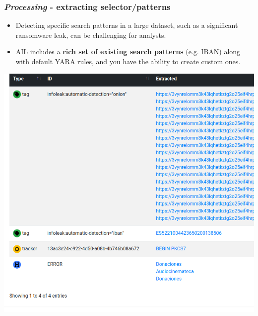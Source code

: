 \documentclass{beamer}
\begin{document}
\begin{frame}
   \frametitle{{\it Processing} - extracting selector/patterns}
	\begin{itemize}
		\item Detecting specific search patterns in a large dataset, such as a significant ransomware leak, can be challenging for analysts.
        \item AIL includes a {\bf rich set of existing search patterns} (e.g. IBAN) along with default YARA rules, and you have the ability to create custom ones.
	\end{itemize}
   \begin{center}
        \includegraphics[scale=0.15]{images/ail-detecting.png}
    \end{center}
\end{frame}
\end{document}
